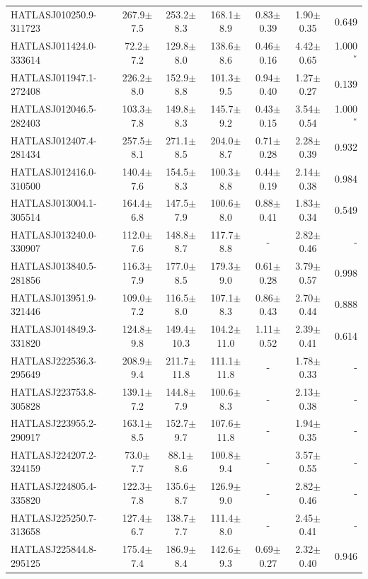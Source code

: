 \documentclass[fleqn,usenatbib]{mnras}
\begin{document}
\begin{table}
\begin{threeparttable}
\begin{tabular}{lcccccr}
		HATLASJ010250.9-311723 & 267.9$\pm$7.5 & 253.2$\pm$8.3 & 168.1$\pm$8.9 & 0.83$\pm$0.39 & 1.90$\pm$0.35 & 0.649 \\
		HATLASJ011424.0-333614 & 72.2$\pm$7.2 & 129.8$\pm$8.0 & 138.6$\pm$8.6 & 0.46$\pm$0.16 & 4.42$\pm$0.65 & 1.000$^{\ast}$ \\
		HATLASJ011947.1-272408 & 226.2$\pm$8.0 & 152.9$\pm$8.8 & 101.3$\pm$9.5 & 0.94$\pm$0.40 & 1.27$\pm$0.27 & 0.139 \\
		HATLASJ012046.5-282403 & 103.3$\pm$7.8 & 149.8$\pm$8.3 & 145.7$\pm$9.2 & 0.43$\pm$0.15 & 3.54$\pm$0.54 & 1.000$^{\ast}$ \\
		HATLASJ012407.4-281434 & 257.5$\pm$8.1 & 271.1$\pm$8.5 & 204.0$\pm$8.7 & 0.71$\pm$0.28 & 2.28$\pm$0.39 & 0.932 \\
		HATLASJ012416.0-310500 & 140.4$\pm$7.6 & 154.5$\pm$8.3 & 100.3$\pm$8.8 & 0.44$\pm$0.19 & 2.14$\pm$0.38 & 0.984 \\
		HATLASJ013004.1-305514 & 164.4$\pm$6.8 & 147.5$\pm$7.9 & 100.6$\pm$8.0 & 0.88$\pm$0.41 & 1.83$\pm$0.34 & 0.549 \\
		HATLASJ013240.0-330907 & 112.0$\pm$7.6 & 148.8$\pm$8.7 & 117.7$\pm$8.8 & - & 2.82$\pm$0.46 & - \\
		HATLASJ013840.5-281856 & 116.3$\pm$7.9 & 177.0$\pm$8.5 & 179.3$\pm$9.0 & 0.61$\pm$0.28 & 3.79$\pm$0.57 & 0.998 \\
		HATLASJ013951.9-321446 & 109.0$\pm$7.2 & 116.5$\pm$8.0 & 107.1$\pm$8.3 & 0.86$\pm$0.43 & 2.70$\pm$0.44 & 0.888 \\
		HATLASJ014849.3-331820 & 124.8$\pm$9.8 & 149.4$\pm$10.3 & 104.2$\pm$11.0 & 1.11$\pm$0.52 & 2.39$\pm$0.41 & 0.614 \\
		HATLASJ222536.3-295649 & 208.9$\pm$9.4 & 211.7$\pm$11.8 & 111.1$\pm$11.8 & - & 1.78$\pm$0.33 & - \\
		HATLASJ223753.8-305828 & 139.1$\pm$7.2 & 144.8$\pm$7.9 & 100.6$\pm$8.3 & - & 2.13$\pm$0.38 & - \\
		HATLASJ223955.2-290917 & 163.1$\pm$8.5 & 152.7$\pm$9.7 & 107.6$\pm$11.8 & - & 1.94$\pm$0.35 & - \\
		HATLASJ224207.2-324159 & 73.0$\pm$7.7 & 88.1$\pm$8.6 & 100.8$\pm$9.4 & - & 3.57$\pm$0.55 & - \\
		HATLASJ224805.4-335820 & 122.3$\pm$7.8 & 135.6$\pm$8.7 & 126.9$\pm$9.0 & - & 2.82$\pm$0.46 & - \\
		HATLASJ225250.7-313658 & 127.4$\pm$6.7 & 138.7$\pm$7.7 & 111.4$\pm$8.0 & - & 2.45$\pm$0.41 & - \\
		HATLASJ225844.8-295125 & 175.4$\pm$7.4 & 186.9$\pm$8.4 & 142.6$\pm$9.3 & 0.69$\pm$0.27 & 2.32$\pm$0.40 & 0.946 \\

\end{tabular}
\end{threeparttable}
\end{table}
\end{document}
